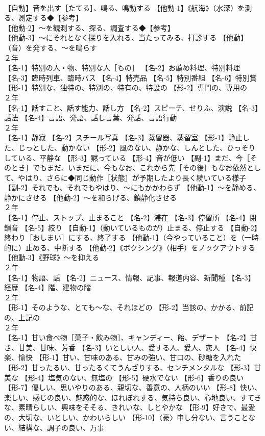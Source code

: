 \documentclass[8pt]{extreport}
\begin{document}
\begin{CJK}{UTF8}{min}
\\	【自動】音を出す［たてる］、鳴る、鳴動する 【他動-1】《航海》（水深）を測る、測定する◆【参考】
\\	【他動-2】～を観測する、探る、調査する◆【参考】
\\	【他動-3】～にそれとなく探りを入れる、当たってみる、打診する 【他動】（音）を発する、～を鳴らす
\\	２年	
\\	【名-1】特別の人・物、特別な人［もの］ 【名-2】お薦め料理、特別料理 【名-3】臨時列車、臨時バス 【名-4】特売品 【名-5】特別番組 【名-6】特別賞 【形-1】特別な、独特の、特別の、特有の、特設の 【形-2】専門の、専用の
\\	２年	
\\	【名-1】話すこと、話す能力、話し方 【名-2】スピーチ、せりふ、演説 【名-3】話法 【名-4】言語、発語、話し言葉、発話、言語行動
\\	２年	
\\	【名-1】静寂 【名-2】スチール写真 【名-3】蒸留器、蒸留室 【形-1】静止した、じっとした、動かない 【形-2】風のない、静かな、しんとした、ひっそりしている、平静な 【形-3】黙っている 【形-4】音が低い 【副-1】まだ、今［そのとき］でもまだ、いまだに、今もなお、これから先［その後］もなお依然として、やはり、さらに◆同じ動作［状態］が予期したより長く続いている様子 【副-2】それでも、それでもやはり、～にもかかわらず 【他動-1】～を静める、静かにさせる 【他動-2】～を和らげる、鎮静化させる
\\	２年	
\\	【名-1】停止、ストップ、止まること 【名-2】滞在 【名-3】停留所 【名-4】閉鎖音 【名-5】絞り 【自動-1】（動いているものが）止まる、停止する 【自動-2】終わり［おしまい］にする、終了する 【他動-1】（今やっていること）を（一時的に）止める、中断する 【他動-2】《ボクシング》（相手）をノックアウトする 【他動-3】《野球》～を抑える
\\	２年	
\\	【名-1】物語、話 【名-2】ニュース、情報、記事、報道内容、新聞種 【名-3】経歴 【名-4】階、建物の階
\\	２年	
\\	【形-1】そのような、とても～な、それほどの 【形-2】当該の、かかる、前記の、上記の
\\	２年	
\\	【名-1】甘い食べ物［菓子・飲み物］、キャンディー、飴、デザート 【名-2】甘さ、甘美、甘味、芳香 【名-3】いとしい人、愛する人、愛人、恋人 【名-4】快楽、愉快 【形-1】甘い、甘味のある、甘みの強い、甘口の、砂糖を入れた 【形-2】甘ったるい、甘ったるくてうんざりする、センチメンタルな 【形-3】甘美な 【形-4】塩気のない、無塩の 【形-5】硬水でない 【形-6】香りの良い 【形-7】優しい、思いやりのある、親切な、善意の、人柄のいい 【形-8】快い、楽しい、感じの良い、魅惑的な、ほれぼれする、気持ち良い、心地良い、すてきな、素晴らしい、興味をそそる、きれいな、しとやかな 【形-9】好きで、最愛の、大切な、いとしい、かわいらしい 【形-10】〈豪〉申し分ない、言うことない、結構な、調子の良い、万事 

\end{CJK}
\end{document}
